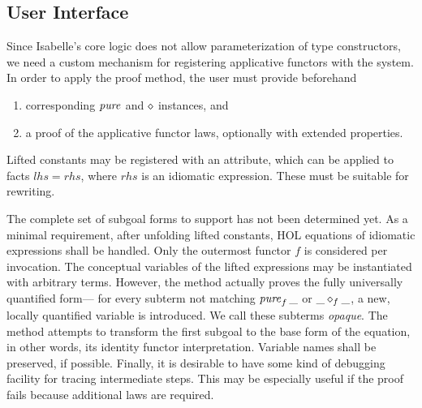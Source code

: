 \subsection{User Interface}\label{subsec:interface}

Since Isabelle's core logic does not allow parameterization of type constructors,
we need a custom mechanism for registering applicative functors with the
system.
In order to apply the proof method, the user must provide beforehand
\begin{enumerate}
	\item corresponding $\operatorname{\mathit{pure}}$ and $\diamond$ instances, and
	\item a proof of the applicative functor laws, optionally with extended
	properties.
\end{enumerate}
Lifted constants may be registered with an attribute, which can be applied to
facts $\mathit{lhs} = \mathit{rhs}$, where $\mathit{rhs}$ is an idiomatic
expression.
These must be suitable for rewriting.

The complete set of subgoal forms to support has not been determined yet.
\todo{}
As a minimal requirement, after unfolding lifted constants, HOL equations of
idiomatic expressions shall be handled.
Only the outermost functor $f$ is considered per invocation.
The conceptual variables of the lifted expressions may be instantiated with
arbitrary terms.
However, the method actually proves the fully universally quantified form---%
for every subterm not matching $\operatorname{\mathit{pure}}_f{\_}$ or $\_ \diamond_f \_$, a new, locally
quantified variable is introduced.
We call these subterms \emph{opaque}.
The method attempts to transform the first subgoal to the base form of the
equation, in other words, its identity functor interpretation.
Variable names shall be preserved, if possible.
Finally, it is desirable to have some kind of debugging facility for tracing
intermediate steps.
This may be especially useful if the proof fails because additional laws are
required.

